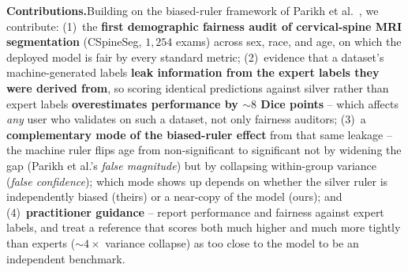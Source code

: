 \smallskip\noindent\textbf{Contributions.}\enspace Building on the biased-ruler
framework of Parikh et al.~\cite{parikh2025labelbias,parikh2025whofails}, we contribute:
(1)~the \textbf{first demographic fairness audit of cervical-spine MRI segmentation}
(CSpineSeg, $1{,}254$ exams) across sex, race, and age, on which the deployed model is
fair by every standard metric; (2)~evidence that a dataset's machine-generated labels
\textbf{leak information from the expert labels they were derived from}, so scoring
identical predictions against silver rather than expert labels \textbf{overestimates
performance by ${\sim}8$ Dice points} -- which affects \emph{any} user who validates on
such a dataset, not only fairness auditors; (3)~a \textbf{complementary mode of the
biased-ruler effect} from that same leakage -- the machine ruler flips age from
non-significant to significant not by widening the gap (Parikh et al.'s \emph{false
magnitude}) but by collapsing within-group variance (\emph{false confidence}); which mode
shows up depends on whether the silver ruler is independently biased (theirs) or a
near-copy of the model (ours); and (4)~\textbf{practitioner guidance} -- report
performance and fairness against expert labels, and treat a reference that scores both
much higher and much more tightly than experts (${\sim}4\times$ variance collapse) as too
close to the model to be an independent benchmark.
